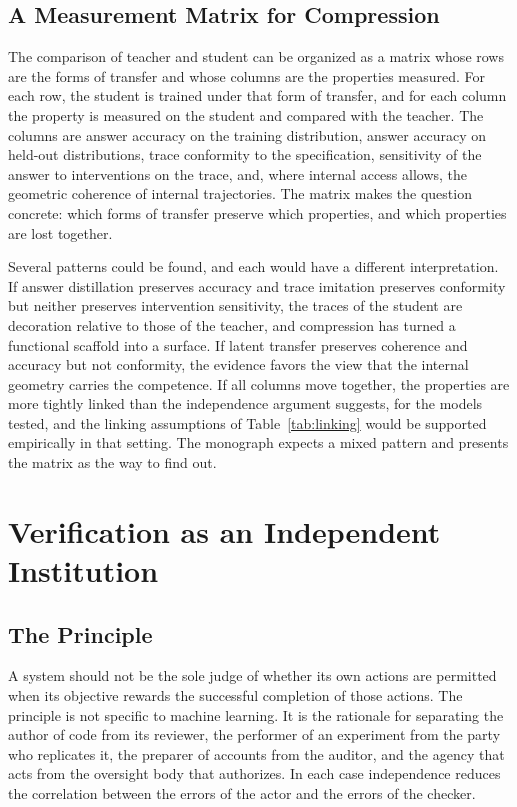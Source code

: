 \section{A Measurement Matrix for Compression}

The comparison of teacher and student can be organized as a matrix whose rows are the forms of transfer and whose columns are the properties measured. For each row, the student is trained under that form of transfer, and for each column the property is measured on the student and compared with the teacher. The columns are answer accuracy on the training distribution, answer accuracy on held-out distributions, trace conformity to the specification, sensitivity of the answer to interventions on the trace, and, where internal access allows, the geometric coherence of internal trajectories. The matrix makes the question concrete: which forms of transfer preserve which properties, and which properties are lost together.

Several patterns could be found, and each would have a different interpretation. If answer distillation preserves accuracy and trace imitation preserves conformity but neither preserves intervention sensitivity, the traces of the student are decoration relative to those of the teacher, and compression has turned a functional scaffold into a surface. If latent transfer preserves coherence and accuracy but not conformity, the evidence favors the view that the internal geometry carries the competence. If all columns move together, the properties are more tightly linked than the independence argument suggests, for the models tested, and the linking assumptions of Table~\ref{tab:linking} would be supported empirically in that setting. The monograph expects a mixed pattern and presents the matrix as the way to find out.

\chapter{Verification as an Independent Institution}
\label{ch:institutions}

\section{The Principle}

A system should not be the sole judge of whether its own actions are permitted when its objective rewards the successful completion of those actions. The principle is not specific to machine learning. It is the rationale for separating the author of code from its reviewer, the performer of an experiment from the party who replicates it, the preparer of accounts from the auditor, and the agency that acts from the oversight body that authorizes. In each case independence reduces the correlation between the errors of the actor and the errors of the checker.

